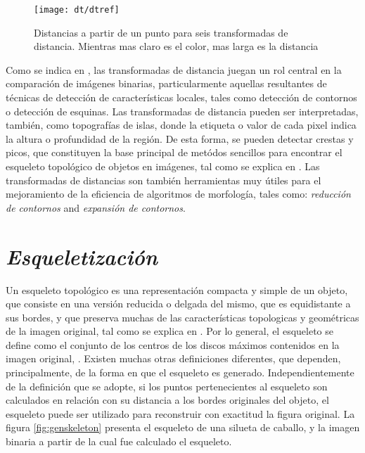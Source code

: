\begin{figure}[h t b p ! H]
 \centering
   \texttt{[image: dt/dtref]}
 \caption[Distancias a partir de un punto para seis transformadas de distancia]{ 
   Distancias a partir de un punto para seis transformadas de distancia. Mientras 
   mas claro es el color, mas larga es la distancia \cite[p.365]{dtresearch}}
 \label{fig:dtexamples}
\end{figure}

Como se indica en \cite{dtresearch2}, las transformadas de distancia juegan un rol
central en la comparaci\'on de im\'agenes binarias, particularmente aquellas
resultantes de t\'ecnicas de detecci\'on de caracter\'isticas locales, tales 
como detecci\'on de contornos o detecci\'on de esquinas.
Las transformadas de distancia pueden ser interpretadas, tambi\'en, como
topograf\'ias de islas, donde la etiqueta o valor de cada pixel indica la altura o 
profundidad de la regi\'on. De esta forma, se pueden detectar crestas y picos, 
que constituyen la base principal de met\'odos sencillos para encontrar el 
esqueleto topol\'ogico de objetos en im\'agenes, tal como se explica en \cite[237]{ridgedt}.
Las transformadas de distancias son tambi\'en herramientas muy \'utiles para el 
mejoramiento de la eficiencia de algoritmos de morfolog\'ia, tales como: 
\emph{reducci\'on de contornos} and \emph{expansi\'on de contornos}.\\

\section{\emph{Esqueletizaci\'on}}
\label{sec:skeletonization}

Un esqueleto topol\'ogico es una representaci\'on compacta y simple de un objeto, que
consiste en una versi\'on reducida o delgada del mismo, que es equidistante a sus bordes, 
y que preserva muchas de las caracter\'isticas topologicas y geom\'etricas de la
imagen original, tal como se explica en \cite{wikipedia:skeleton,ssm,augmented}. 
Por lo general, el esqueleto se define como el conjunto de los centros de los discos m\'aximos
contenidos en la imagen original, \cite{ssm,augmented}. Existen muchas otras definiciones diferentes,
que dependen, principalmente, de la forma en que el esqueleto es generado.
Independientemente de la definici\'on que se adopte, si los puntos pertenecientes al esqueleto
son calculados en relaci\'on con su distancia a los bordes originales del objeto, 
el esqueleto puede ser utilizado para reconstruir con exactitud la figura original.
La figura \ref{fig:genskeleton} presenta el esqueleto de una silueta de caballo, y la
imagen binaria a partir de la cual fue calculado el esqueleto.

